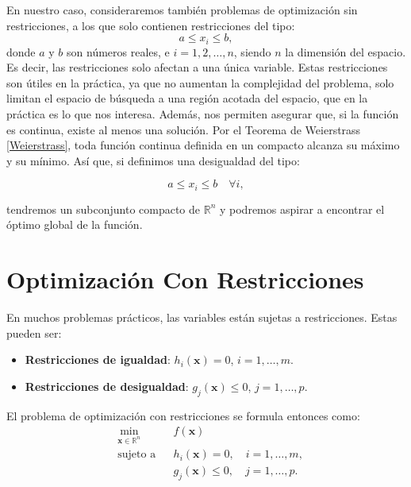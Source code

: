 En nuestro caso, consideraremos también problemas de optimización sin restricciones, a los que solo contienen restricciones del tipo:
\begin{equation}
	a \leq x_i \leq b,
\end{equation}
donde \(a\) y \(b\) son números reales, e \(i = 1, 2, \dots, n\), siendo \(n\) la dimensión del espacio. Es decir, las restricciones solo afectan a una única variable. Estas restricciones son útiles en la práctica, ya que no aumentan la complejidad del problema, solo limitan el espacio de búsqueda a una región acotada del espacio, que en la práctica es lo que nos interesa. Además, nos permiten asegurar que, si la función es continua, existe al menos una solución. Por el Teorema de Weierstrass \ref{Weierstrass}, toda función continua definida en un compacto alcanza su máximo y su mínimo. Así que, si definimos una desigualdad del tipo:

\begin{equation}
	a \leq x_i \leq b \quad \forall i,
\end{equation}

tendremos un subconjunto compacto de $\mathbb{R}^n$ y podremos aspirar a encontrar el óptimo global de la función.

\section{Optimización Con Restricciones}

En muchos problemas prácticos, las variables están sujetas a restricciones. Estas pueden ser:

\begin{itemize}
    \item \textbf{Restricciones de igualdad}: $h_i(\mathbf{x}) = 0$, $i = 1, \dots, m$.
    \item \textbf{Restricciones de desigualdad}: $g_j(\mathbf{x}) \leq 0$, $j = 1, \dots, p$.
\end{itemize}

El problema de optimización con restricciones se formula entonces como:
\begin{equation}
\begin{aligned}
& \min_{\mathbf{x} \in \mathbb{R}^n} & & f(\mathbf{x}) \\
& \text{sujeto a} & & h_i(\mathbf{x}) = 0, \quad i = 1, \dots, m, \\
& & & g_j(\mathbf{x}) \leq 0, \quad j = 1, \dots, p.
\end{aligned}
\end{equation}


